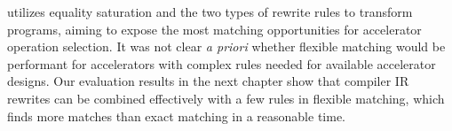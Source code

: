 \TLA utilizes equality saturation and the two types of rewrite rules to transform 
  programs, aiming to expose the most matching opportunities for accelerator 
  operation selection.
It was not clear \textit{a priori} whether flexible matching would be performant for accelerators with complex \mapping rules needed for available accelerator designs. Our evaluation results in the next chapter show that compiler IR rewrites can be combined effectively with a few \mapping rules in flexible matching, which finds more matches than exact matching in a reasonable time. 

